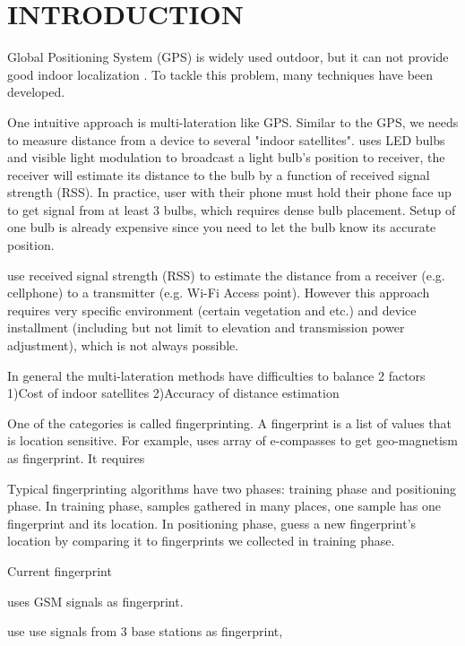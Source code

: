 \chapter{INTRODUCTION}

Global Positioning System (GPS) is widely used outdoor, but it can not provide good indoor localization \cite{pulkkinen2011semi, varshavsky2007gsm}. To tackle this problem, many techniques have been developed. 

One intuitive approach is multi-lateration like GPS. Similar to the GPS, we needs to measure distance from a device to several "indoor satellites". \cite{hu2013pharos} uses LED bulbs and visible light modulation to broadcast a light bulb's position to receiver, the receiver will estimate its distance to the bulb by a function of received signal strength (RSS). In practice, user with their phone must hold their phone face up to get signal from at least 3 bulbs, which requires dense bulb placement. Setup of one bulb is already expensive since you need to let the bulb know its accurate position. 

\cite{whitehouse2007practical} use received signal strength (RSS) to estimate the distance from a receiver (e.g. cellphone) to a transmitter (e.g. Wi-Fi Access point). However this approach requires very specific environment (certain vegetation and etc.) and device installment (including but not limit to elevation and transmission power adjustment), which is not always possible.

In general the multi-lateration methods have difficulties to balance 2 factors 1)Cost of indoor satellites 2)Accuracy of distance estimation 
 
One of the categories is called fingerprinting. A fingerprint is a list of values that is location sensitive. For example, \cite{chung2011indoor} uses array of e-compasses to get geo-magnetism as fingerprint. It requires  

Typical fingerprinting algorithms have two phases: training phase and positioning phase. In training phase, samples gathered in many places, one sample has one fingerprint and its location. In positioning phase, guess a new fingerprint's location by comparing it to fingerprints we collected in training phase. 

Current fingerprint 


\cite{varshavsky2007gsm} uses GSM signals as fingerprint. 

\cite{bahl2000radar} use use signals from 3 base stations as fingerprint,


